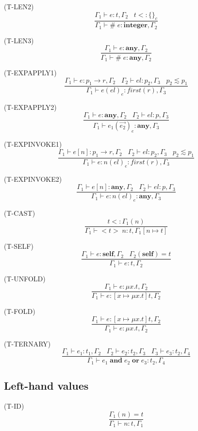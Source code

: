 \documentclass{paper}
\newcommand{\Any}{\mathbf{any}}
\newcommand{\Self}{\mathbf{self}}
\newcommand{\Integer}{\mathbf{integer}}
\newcommand{\mylabel}[1]{\; (\textsc{#1})}
\newcommand{\env}{\Gamma}
\newcommand{\subtype}{<:}
\begin{document}
\mylabel{T-LEN2}
\[
\dfrac{\env_{1} \vdash e:t, \env_{2} \;\;\;
       t \subtype \{\}_{c}}
      {\env_{1} \vdash \# \; e:\Integer, \env_{2}}
\]

\mylabel{T-LEN3}
\[
\dfrac{\env_{1} \vdash e:\Any, \env_{2}}
      {\env_{1} \vdash \# \; e:\Any, \env_{2}}
\]

\mylabel{T-EXPAPPLY1}
\[
\dfrac{\env_{1} \vdash e:p_{1} \rightarrow r, \env_{2} \;\;\;
       \env_{2} \vdash el:p_{2}, \env_{3} \;\;\;
       p_{2} \lesssim p_{1}}
      {\env_{1} \vdash e(el)_{e}:first(r), \env_{3}}
\]

\mylabel{T-EXPAPPLY2}
\[
\dfrac{\env_{1} \vdash e:\Any, \env_{2} \;\;\;
       \env_{2} \vdash el:p, \env_{3}}
      {\env_{1} \vdash e_{1}(\vec{e_{2}})_{e}:\Any, \env_{3}}
\]

\mylabel{T-EXPINVOKE1}
\[
\dfrac{\env_{1} \vdash e[n]:p_{1} \rightarrow r, \env_{2} \;\;\;
       \env_{2} \vdash el:p_{2}, \env_{3} \;\;\;
       p_{2} \lesssim p_{1}}
      {\env_{1} \vdash e{:}n(el)_{e}:first(r), \env_{3}}
\]

\mylabel{T-EXPINVOKE2}
\[
\dfrac{\env_{1} \vdash e[n]:\Any, \env_{2} \;\;\;
       \env_{2} \vdash el:p, \env_{3}}
      {\env_{1} \vdash e{:}n(el)_{e}:\Any, \env_{3}}
\]

\mylabel{T-CAST}
\[
\dfrac{t \subtype \env_{1}(n)}
      {\env_{1} \vdash {<}t{>} \; n:t, \env_{1}[n \mapsto t]}
\]

\mylabel{T-SELF}
\[
\dfrac{\env_{1} \vdash e:\Self, \env_{2} \;\;\;
       \env_{2}(\Self) = t}
      {\env_{1} \vdash e:t, \env_{2}}
\]

\mylabel{T-UNFOLD}
\[
\dfrac{\env_{1} \vdash e:\mu x.t, \env_{2}}
      {\env_{1} \vdash e:[x \mapsto \mu x.t]t, \env_{2}}
\]

\mylabel{T-FOLD}
\[
\dfrac{\env_{1} \vdash e:[x \mapsto \mu x.t]t, \env_{2}}
      {\env_{1} \vdash e:\mu x.t, \env_{2}}
\]

\mylabel{T-TERNARY}
\[
\dfrac{\env_{1} \vdash e_{1}:t_{1}, \env_{2} \;\;\;
       \env_{2} \vdash e_{2}:t_{2}, \env_{3} \;\;\;
       \env_{3} \vdash e_{3}:t_{2}, \env_{4}}
      {\env_{1} \vdash e_{1} \; \mathbf{and} \; e_{2} \; \mathbf{or} \; e_{3}:t_{2}, \env_{4}}
\]

\subsection{Left-hand values}

\noindent

\mylabel{T-ID}
\[
\dfrac{\env_{1}(n) = t}
      {\env_{1} \vdash n:t, \env_{1}}
\]
\end{document}
